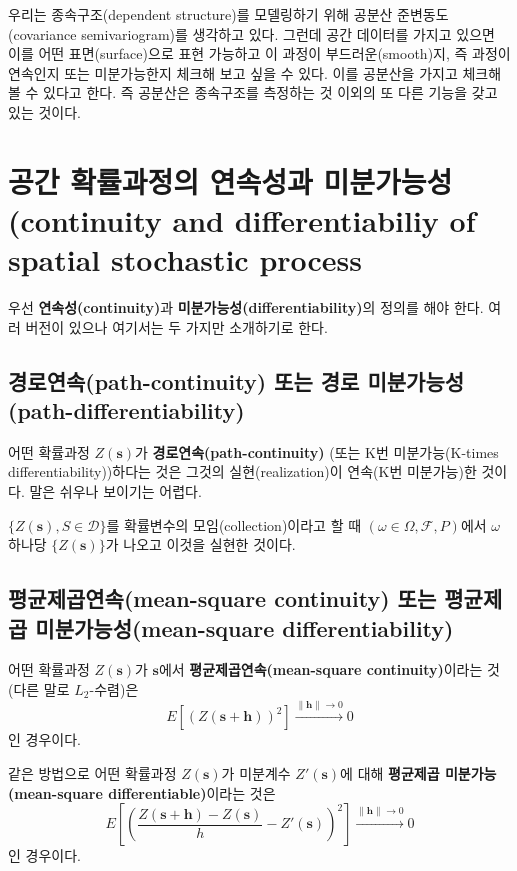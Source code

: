 \documentclass[b5paper,]{scrbook}
\theoremstyle{plain}
\theoremstyle{definition}
\numberwithin{equation}{section}
\begin{document}
우리는 종속구조(dependent structure)를 모델링하기 위해 공분산
준변동도(covariance semivariogram)를 생각하고 있다. 그런데 공간 데이터를
가지고 있으면 이를 어떤 표면(surface)으로 표현 가능하고 이 과정이
부드러운(smooth)지, 즉 과정이 연속인지 또는 미분가능한지 체크해 보고
싶을 수 있다. 이를 공분산을 가지고 체크해 볼 수 있다고 한다. 즉 공분산은
종속구조를 측정하는 것 이외의 또 다른 기능을 갖고 있는 것이다.

\section{공간 확률과정의 연속성과 미분가능성(continuity and
differentiabiliy of spatial stochastic
process}\label{---continuity-and-differentiabiliy-of-spatial-stochastic-process}

우선 \textbf{연속성(continuity)}과
\textbf{미분가능성(differentiability)}의 정의를 해야 한다. 여러 버전이
있으나 여기서는 두 가지만 소개하기로 한다.

\subsection{경로연속(path-continuity) 또는 경로
미분가능성(path-differentiability)}\label{path-continuity---path-differentiability}

어떤 확률과정 \(Z(\mathbf{s})\)가 \textbf{경로연속(path-continuity)}
(또는 K번 미분가능(K-times differentiability))하다는 것은 그것의
실현(realization)이 연속(K번 미분가능)한 것이다. 말은 쉬우나 보이기는
어렵다.

\(\{ Z(\mathbf{s}) , S \in \mathcal{D}\}\)를 확률변수의
모임(collection)이라고 할 때 \((\omega \in \Omega, \mathcal{F}, P)\)에서
\(\omega\) 하나당 \(\{ Z(\mathbf{s})\}\)가 나오고 이것을 실현한 것이다.

\subsection{평균제곱연속(mean-square continuity) 또는 평균제곱
미분가능성(mean-square
differentiability)}\label{mean-square-continuity---mean-square-differentiability}

어떤 확률과정 \(Z(\mathbf{s})\)가 \(\mathbf{s}\)에서
\textbf{평균제곱연속(mean-square continuity)}이라는 것(다른 말로
\(L_{2}\)-수렴)은
\[E[(Z(\mathbf{s}+\mathbf{h}))^{2}] \stackrel{\|\mathbf{h}\| \rightarrow 0}{\rightarrow} 0\]
인 경우이다.

같은 방법으로 어떤 확률과정 \(Z(\mathbf{s})\)가 미분계수
\(Z'(\mathbf{s})\)에 대해 \textbf{평균제곱 미분가능(mean-square
differentiable)}이라는 것은
\[E[(\frac{Z(\mathbf{s}+\mathbf{h})-Z(\mathbf{s})}{h}-Z'(\mathbf{s}))^{2}] \stackrel{\|\mathbf{h}\| \rightarrow 0}{\rightarrow} 0\]
인 경우이다.
\end{document}
